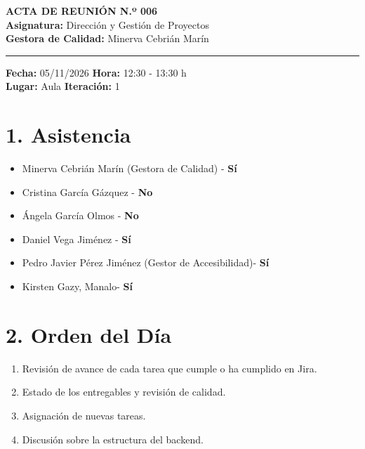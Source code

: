 


\begin{center}

{\Large \textbf{ACTA DE REUNIÓN N.º 006}}\\[0.2cm]

\textbf{Asignatura:} Dirección y Gestión de Proyectos\\

\textbf{Gestora de Calidad:} Minerva Cebrián Marín

\end{center}



\vspace{0.3cm}

\hrule

\vspace{0.4cm}


\noindent \textbf{Fecha:} 05/11/2026 \hfill \textbf{Hora:} 12:30 - 13:30 h\\

\noindent \textbf{Lugar:} Aula \hfill \textbf{Iteración:} 1



\vspace{0.4cm}



\section*{1. Asistencia}

\begin{itemize}

\item Minerva Cebrián Marín (Gestora de Calidad) - \textbf{Sí}

\item Cristina García Gázquez - \textbf{No}

\item Ángela García Olmos - \textbf{No}

\item Daniel Vega Jiménez - \textbf{Sí}

\item Pedro Javier Pérez Jiménez (Gestor de Accesibilidad)- \textbf{Sí}

\item Kirsten Gazy, Manalo- \textbf{Sí}



\end{itemize}


\section*{2. Orden del Día}
\begin{enumerate}
\item Revisión de avance de cada tarea que cumple o ha cumplido en Jira.
\item Estado de los entregables y revisión de calidad.
\item Asignación de nuevas tareas.
\item Discusión sobre la estructura del backend.
\end{enumerate}

